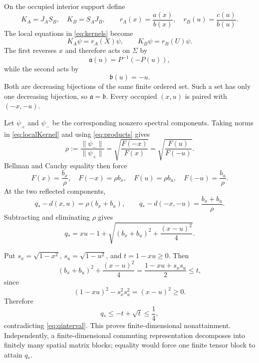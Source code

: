 \documentclass[11pt]{article}
\begin{document}
On the occupied interior support define
\[
K_A=J_AS_B,\quad K_B=S_AJ_B,
\qquad
r_A(x)=\frac{a(x)}{b(x)},\quad r_B(u)=\frac{c(u)}{b(u)}.
\]
The local equations in \eqref{eq:kernels} become
\begin{equation}
K_A\psi=r_A(X)\psi,
\qquad
K_B\psi=r_B(U)\psi.                               \label{eq:localKernel}
\end{equation}
The first reverses $x$ and therefore acts on $\Sigma$ by
\begin{equation}
\mathfrak a(u)=P^{-1}(-P(u)),                      \label{eq:amap}
\end{equation}
while the second acts by
\begin{equation}
\mathfrak b(u)=-u.                                 \label{eq:bmap}
\end{equation}
Both are decreasing bijections of the same finite ordered set.  Such a set
has only one decreasing bijection, so $\mathfrak a=\mathfrak b$.  Every
occupied $(x,u)$ is paired with $(-x,-u)$.

Let $\psi_+$ and $\psi_-$ be the corresponding nonzero spectral components.
Taking norms in \eqref{eq:localKernel} and using \eqref{eq:products} gives
\begin{equation}
\rho:=\frac{\|\psi_-\|}{\|\psi_+\|}
=\sqrt{\frac{F(-x)}{F(x)}}
=\sqrt{\frac{F(u)}{F(-u)}}.                       \label{eq:rho}
\end{equation}
Bellman and Cauchy equality then force
\begin{equation}
F(x)=\frac{b_x}{\rho},\quad F(-x)=\rho b_x,
\quad F(u)=\rho b_u,\quad F(-u)=\frac{b_u}{\rho}. \label{eq:Ffour}
\end{equation}
At the two reflected components,
\begin{equation}
q_*-d(x,u)=\rho(b_x+b_u),
\qquad
q_*-d(-x,-u)=\frac{b_x+b_u}{\rho}.                \label{eq:twoValues}
\end{equation}
Subtracting and eliminating $\rho$ gives
\begin{equation}
q_*=xu-1+\sqrt{(b_x+b_u)^2+\frac{(x-u)^2}{4}}.     \label{eq:qfinite}
\end{equation}

Put $s_x=\sqrt{1-x^2}$, $s_u=\sqrt{1-u^2}$, and $t=1-xu\ge0$.  Then
\begin{equation}
(b_x+b_u)^2+\frac{(x-u)^2}{4}
=\frac{1-xu+s_xs_u}{2}\le t,                      \label{eq:radbound}
\end{equation}
since
\[
(1-xu)^2-s_x^2s_u^2=(x-u)^2\ge0.
\]
Therefore
\begin{equation}
q_*\le-t+\sqrt t\le\frac14,                       \label{eq:quarter}
\end{equation}
contradicting \eqref{eq:qinterval}.  This proves finite-dimensional
nonattainment.  Independently, a finite-dimensional commuting representation
decomposes into finitely many spatial matrix blocks; equality would force one
finite tensor block to attain $q_*$.
\end{document}
